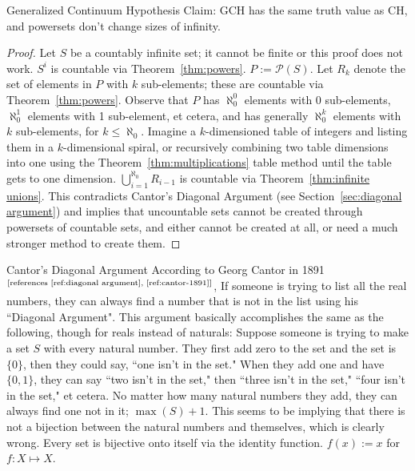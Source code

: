 \documentclass[12pt]{article}
\begin{document}
\begin{section}{Generalized Continuum Hypothesis}\label{sec:GCH}
	Claim: GCH has the same truth value as CH, and powersets don't change sizes of infinity.
	\begin{proof}
		Let $S$ be a countably infinite set; it cannot be finite or this proof does not work.
		$S^i$ is countable via Theorem~\ref{thm:powers}. $P :=\mathcal P(S)$. Let $R_k$ denote
		the set of elements in $P$ with $k$ sub-elements; these are countable via
		Theorem~\ref{thm:powers}. Observe that $P$ has $\aleph_0^0$ elements with 0 sub-elements,
		$\aleph_0^1$ elements with 1 sub-element, et cetera, and has generally $\aleph_0^k$
		elements with $k$ sub-elements, for $k\leqslant \aleph_0$. Imagine a $k$-dimensioned
		table of integers and listing them in a $k$-dimensional spiral, or recursively combining
		two table dimensions into one using the Theorem~\ref{thm:multiplications} table method
		until the table gets to one dimension. $\displaystyle\bigcup_{i=1}^{\aleph_0}R_{i-1}$ is
		countable via Theorem~\ref{thm:infinite unions}. This contradicts Cantor's Diagonal
		Argument (see Section~\ref{sec:diagonal argument}) and implies that uncountable sets
		cannot be created through powersets of countable sets, and either cannot be created at
		all, or need a much stronger method to create them.
	\end{proof}
\end{section}

\begin{section}{Cantor's Diagonal Argument}\label{sec:diagonal argument}
	According to Georg Cantor in 1891$^\text{[references \ref{ref:diagonal argument},
	\ref{ref:cantor-1891}]}$, If someone is trying to list all the real numbers, they can
	always find a number that is not in the list using his ``Diagonal Argument". This
	argument basically accomplishes the same as the following, though for reals instead of
	naturals: Suppose someone is trying to make a set $S$ with every natural number. They
	first add zero to the set and the set is $\{0\}$, then they could say, ``one isn't in
	the set." When they add one and have $\{0,1\}$, they can say ``two isn't in the set,"
	then ``three isn't in the set," ``four isn't in the set," et cetera. No matter how many
	natural numbers they add, they can always find one not in it; $\max(S)+1$. This seems
	to be implying that there is not a bijection between the natural numbers and themselves,
	which is clearly wrong. Every set is bijective onto itself via the identity function.
	$f(x) := x$ for  $f:X\mapsto X$.
\end{section}
\end{document}
